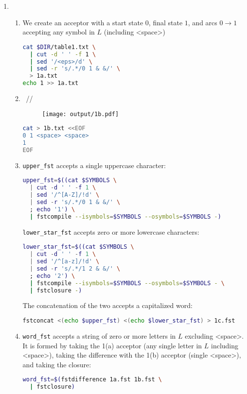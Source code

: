 \documentclass[a4paper,oneside,reqno]{amsart}
\begin{document}
\begin{enumerate}[label=\arabic*.]
  \item
    \begin{enumerate}[label=(\alph*)]
      \item
        We create an acceptor with a start state $0$, final state $1$, and
        arcs $0 \to 1$ accepting any symbol in $L$ (including <space>)
        \begin{lstlisting}[language=bash]
cat $DIR/table1.txt \
  | cut -d ' ' -f 1 \
  | sed '/<eps>/d' \
  | sed -r 's/.*/0 1 & &/' \
  > 1a.txt
echo 1 >> 1a.txt
        \end{lstlisting}

      \item~//
        \begin{figure}[ht!]
          \begin{center}
            \texttt{[image: output/1b.pdf]}
          \end{center}
        \end{figure}
        \begin{lstlisting}[language=bash]
cat > 1b.txt <<EOF
0 1 <space> <space>
1
EOF
        \end{lstlisting}

      \item \texttt{upper\_fst} accepts a single uppercase character:
        \begin{lstlisting}[language=bash]
upper_fst=$((cat $SYMBOLS \
  | cut -d ' ' -f 1 \
  | sed '/^[A-Z]/!d' \
  | sed -r 's/.*/0 1 & &/' \
  ; echo '1') \
  | fstcompile --isymbols=$SYMBOLS --osymbols=$SYMBOLS -)
        \end{lstlisting}

        \texttt{lower\_star\_fst} accepts zero or more lowercase characters:
        \begin{lstlisting}[language=bash]
lower_star_fst=$((cat $SYMBOLS \
  | cut -d ' ' -f 1 \
  | sed '/^[a-z]/!d' \
  | sed -r 's/.*/1 2 & &/' \
  ; echo '2') \
  | fstcompile --isymbols=$SYMBOLS --osymbols=$SYMBOLS - \
  | fstclosure -)
        \end{lstlisting}

        The concatenation of the two accepts a capitalized word:
        \begin{lstlisting}[language=bash]
fstconcat <(echo $upper_fst) <(echo $lower_star_fst) > 1c.fst
        \end{lstlisting}

      \item \texttt{word\_fst} accepts a string of zero or more letters in $L$
        excluding <space>. It is formed by taking the 1(a) acceptor (any single
        letter in $L$ including <space>), taking the difference with the 1(b) acceptor
        (single <space>), and taking the closure:
        \begin{lstlisting}[language=bash]
word_fst=$(fstdifference 1a.fst 1b.fst \
  | fstclosure)
        \end{lstlisting}


\end{enumerate}
\end{enumerate}
\end{document}
